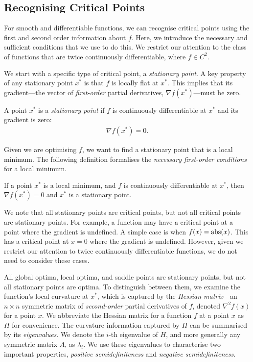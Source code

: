 \subsection{Recognising Critical Points}
\label{ssec:recognising_critical_points}

For smooth and differentiable functions, we can recognise critical points using the first and second order information about $f$. Here, we introduce the necessary and sufficient conditions that we use to do this. We restrict our attention to the class of functions that are twice continuously differentiable, where $f \in C^2$.

We start with a specific type of critical point, a \textit{stationary point}. A key property of any stationary point $x^*$ is that $f$ is locally flat at $x^*$. This implies that its gradient---the vector of \textit{first-order} partial derivatives, $\nabla f(x^*)$---must be zero.
\begin{definition}
    A point $x^*$ is a \textit{stationary point} if $f$ is continuously differentiable at $x^*$ and its gradient is zero:
    \begin{align}
        \nabla f(x^*) = 0.
    \end{align}
\end{definition}

Given we are optimising $f$, we want to find a stationary point that is a local minimum. The following definition formalises the \textit{necessary first-order conditions} for a local minimum.
\begin{definition}
    If a point $x^*$ is a local minimum, and $f$ is continuously differentiable at $x^*$, then $\nabla f(x^*) = 0$ and $x^*$ is a stationary point.
\end{definition}

We note that all stationary points are critical points, but not all critical points are stationary points. For example, a function may have a critical point at a point where the gradient is undefined. A simple case is when $f(x) = \operatorname{abs}({x})$. This has a critical point at $x = 0$ where the gradient is undefined. However, given we restrict our attention to twice continuously differentiable functions, we do not need to consider these cases. 

All global optima, local optima, and saddle points are stationary points, but not all stationary points are optima. To distinguish between them, we examine the function's local curvature at $x^*$, which is captured by the \textit{Hessian matrix}---an $n \times n$ symmetric matrix of \textit{second-order} partial derivatives of $f$, denoted $\nabla^2 f(x)$ for a point $x$. We abbreviate the Hessian matrix for a function $f$ at a point $x$ as $H$ for convenience. The curvature information captured by $H$ can be summarised by its \textit{eigenvalues}. We denote the $i$-th eigenvalue of $H$, and more generally any symmetric matrix $A$, as $\lambda_i$. We use these eigenvalues to characterise two important properties, \textit{positive semidefiniteness} and \textit{negative semidefiniteness}.

